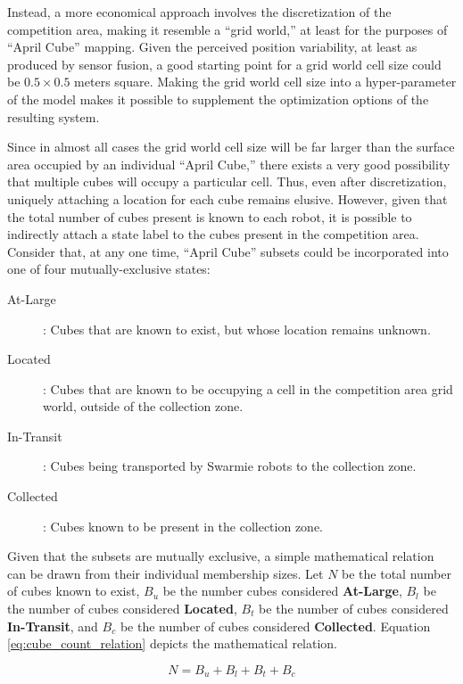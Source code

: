 \documentclass[sigconf,authordraft]{acmart}
\begin{document}
Instead, a more economical approach involves the discretization of the competition area, making it resemble a ``grid world,'' at least for the purposes of ``April Cube'' mapping. Given the perceived position variability, at least as produced by sensor fusion, a good starting point for a grid world cell size could be $0.5 \times 0.5$ meters square. Making the grid world cell size into a hyper-parameter of the model makes it possible to supplement the optimization options of the resulting system.

Since in almost all cases the grid world cell size will be far larger than the surface area occupied by an individual ``April Cube,'' there exists a very good possibility that multiple cubes will occupy a particular cell. Thus, even after discretization, uniquely attaching a location for each cube remains elusive. However, given that the total number of cubes present is known to each robot, it is possible to indirectly attach a state label to the cubes present in the competition area. Consider that, at any one time, ``April Cube'' subsets could be incorporated into one of four mutually-exclusive states:

\begin{description}
  \item[At-Large]: Cubes that are known to exist, but whose location remains unknown.
  \item[Located]: Cubes that are known to be occupying a cell in the competition area grid world, outside of the collection zone.
  \item[In-Transit]: Cubes being transported by Swarmie robots to the collection zone.
  \item[Collected]: Cubes known to be present in the collection zone.
\end{description}

Given that the subsets are mutually exclusive, a simple mathematical relation can be drawn from their individual membership sizes. Let $N$ be the total number of cubes known to exist, $B_u$ be the number cubes considered \textbf{At-Large}, $B_l$ be the number of cubes considered \textbf{Located}, $B_t$ be the number of cubes considered \textbf{In-Transit}, and $B_c$ be the number of cubes considered \textbf{Collected}. Equation \ref{eq:cube_count_relation} depicts the mathematical relation.

\begin{equation}\label{eq:cube_count_relation}
  N = B_u + B_l + B_t + B_c
\end{equation}
\end{document}
